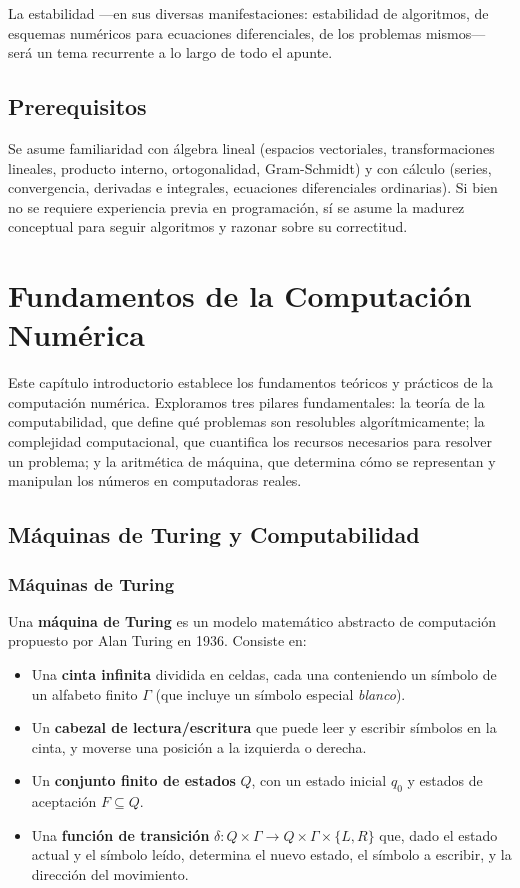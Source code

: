 \documentclass[a4paper,11pt]{report}
\begin{document}
La estabilidad ---en sus diversas manifestaciones: estabilidad de algoritmos, de esquemas numéricos para ecuaciones diferenciales, de los problemas mismos--- será un tema recurrente a lo largo de todo el apunte.

\section*{Prerequisitos}

Se asume familiaridad con álgebra lineal (espacios vectoriales, transformaciones lineales, producto interno, ortogonalidad, Gram-Schmidt) y con cálculo (series, convergencia, derivadas e integrales, ecuaciones diferenciales ordinarias).  Si bien no se requiere experiencia previa en programación, sí se asume la madurez conceptual para seguir algoritmos y razonar sobre su correctitud.


\chapter{Fundamentos de la Computación Numérica}

Este capítulo introductorio establece los fundamentos teóricos y prácticos de la computación numérica. Exploramos tres pilares fundamentales: la teoría de la computabilidad, que define qué problemas son resolubles algorítmicamente; la complejidad computacional, que cuantifica los recursos necesarios para resolver un problema; y la aritmética de máquina, que determina cómo se representan y manipulan los números en computadoras reales.

\section{Máquinas de Turing y Computabilidad}

\subsection{Máquinas de Turing}

Una \textbf{máquina de Turing} es un modelo matemático abstracto de computación propuesto por Alan Turing en 1936. Consiste en:

\begin{itemize}
\item Una \textbf{cinta infinita} dividida en celdas, cada una conteniendo un símbolo de un alfabeto finito $\Gamma$ (que incluye un símbolo especial \textit{blanco}).
\item Un \textbf{cabezal de lectura/escritura} que puede leer y escribir símbolos en la cinta, y moverse una posición a la izquierda o derecha.
\item Un \textbf{conjunto finito de estados} $Q$, con un estado inicial $q_0$ y estados de aceptación $F \subseteq Q$.
\item Una \textbf{función de transición} $\delta: Q \times \Gamma \to Q \times \Gamma \times \{L, R\}$ que, dado el estado actual y el símbolo leído, determina el nuevo estado, el símbolo a escribir, y la dirección del movimiento.
\end{itemize}
\end{document}
